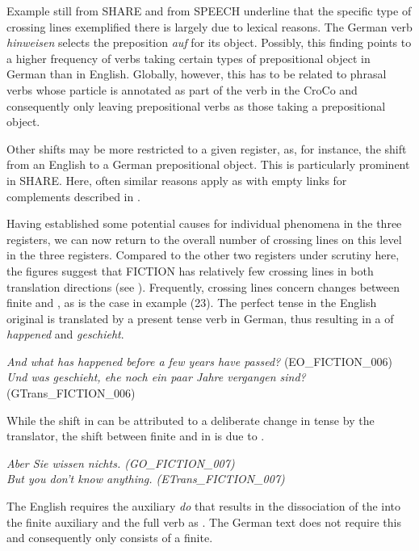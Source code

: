 \documentclass[output=paper]{LSP/langsci}
\begin{document}
Example  still from SHARE and  from SPEECH underline that the specific type of crossing lines exemplified there is largely due to lexical reasons. The German verb \textit{hinweisen} selects the preposition \textit{auf} for its object. Possibly, this finding points to a higher frequency of verbs taking certain types of prepositional object in German than in English. Globally, however, this has to be related to phrasal verbs whose particle is annotated as part of the verb in the CroCo  and consequently only leaving prepositional verbs as those taking a prepositional object. 

Other shifts may be more restricted to a given register, as, for instance, the shift from an English  to a German prepositional object. This is particularly prominent in SHARE. Here, often similar reasons apply as with empty links for complements described in .

Having established some potential causes for individual phenomena in the three registers, we can now return to the overall number of crossing lines on this level in the three registers. Compared to the other two registers under scrutiny here, the figures suggest that FICTION has relatively few crossing lines in both translation directions (see ). Frequently, crossing lines concern changes between finite and , as is the case in example (23). The perfect tense in the English original is translated by a present tense verb in German, thus resulting in a  of \textit{happened} and \textit{geschieht}. 

\ea \label{ex:culo:23}
    \ea \textit{And what has happened before a few years have passed?} (EO\_FICTION\_006)\\
     \ex \textit{Und was geschieht, ehe noch ein paar Jahre vergangen sind?} (GTrans\_FICTION\_006) 
     \z
\z
 
 
While the shift in  can be attributed to a deliberate change in tense by the translator, the shift between finite and  in  is due to .

\ea\label{ex:culo:24}
  \ea 
\textit{Aber Sie wissen nichts. \textup{(GO\_FICTION\_007)}}\\
  \ex 
\textit{But you don't know anything. \textup{(ETrans\_FICTION\_007)}}
  \z
\z 


\newpage 
The English  requires the auxiliary \textit{do} that results in the dissociation of the  into the finite auxiliary and the full verb as . The German text does not require this and consequently only consists of a finite. 
\end{document}

